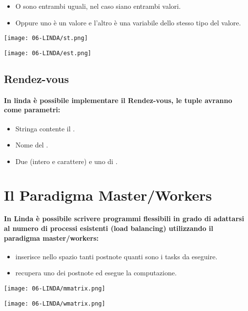 \begin{itemize}
	\item O sono entrambi uguali, nel caso siano entrambi valori.
	\item Oppure uno è un valore e l’altro è una variabile dello stesso tipo del
	      valore.
\end{itemize}

\begin{center}
	\texttt{[image: 06-LINDA/st.png]}
\end{center}


\begin{center}
	\texttt{[image: 06-LINDA/est.png]}
\end{center}

\subsection{Rendez-vous}

\paragraph{In linda è possibile implementare il Rendez-vous, le tuple avranno come parametri:}

\begin{itemize}
	\item Stringa contente il .
	\item Nome del .
	\item Due  (intero e carattere) e uno di .
\end{itemize}

\section{Il Paradigma Master/Workers}

\paragraph{In Linda è possibile scrivere programmi flessibili in grado di adattarsi al numero di
	processi esistenti (load balancing) utilizzando il paradigma master/workers:}
\begin{itemize}
	\item {} inserisce nello spazio tanti postnote quanti sono i tasks da eseguire.
	\item {} recupera uno dei postnote ed esegue la computazione.
\end{itemize}

\begin{center}
	\begin{minipage}{0.45\textwidth}
		\centering
		\texttt{[image: 06-LINDA/mmatrix.png]}
	\end{minipage}
	\hfill
	\begin{minipage}{0.45\textwidth}
		\centering
		\texttt{[image: 06-LINDA/wmatrix.png]}
	\end{minipage}
\end{center}

